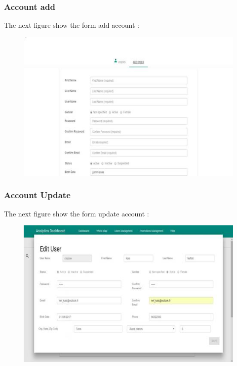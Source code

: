 \subsubsection{Account add}
\label{sec:sec01}
The next figure show the form add account :
\begin{figure}[h!]
	\centering
	\includegraphics[height=0.3\textheight]{fig01/UserManagementAdd}
	\label{fig:FilialesEtClients}
\end{figure}
\subsubsection{Account Update}
\label{sec:sec01}
The next figure show the form update account :
\begin{figure}[h!]
	\centering
	\includegraphics[height=0.3\textheight]{fig01/UserManagementUpdate}
	\label{fig:FilialesEtClients}
\end{figure}
